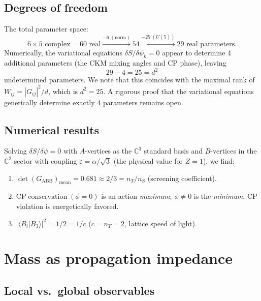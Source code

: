 \documentclass[12pt,a4paper]{article}
\newcommand{\CC}{\mathbb{C}}
\newcommand{\nS}{n_S}
\newcommand{\nT}{n_T}
\begin{document}
\subsection{Degrees of freedom}

The total parameter space:
\begin{equation}
6 \times 5 \text{ complex} = 60 \text{ real}
\xrightarrow{-6\;(\text{norm})} 54
\xrightarrow{-25\;(U(5))} 29 \text{ real parameters.}
\end{equation}
Numerically, the variational equations $\delta S/\delta\psi_k = 0$
appear to determine 4 additional parameters (the CKM mixing
angles and CP phase), leaving
\begin{equation}
29 - 4 = 25 = d^2
\end{equation}
undetermined parameters.  We note that this coincides with the
maximal rank of $W_{ij} = |G_{ij}|^2/d$, which is $d^2 = 25$.
A rigorous proof that the variational equations generically
determine exactly 4 parameters remains open.

\subsection{Numerical results}

Solving $\delta S/\delta\psi = 0$ with $A$-vertices as the
$\CC^3$ standard basis and $B$-vertices in the $\CC^2$ sector
with coupling $\varepsilon = \alpha/\sqrt{3}$ (the physical
value for $Z = 1$), we find:
\begin{enumerate}
\item $\det(G_{\mathrm{ABB}})_{\mathrm{mean}} = 0.681
\approx 2/3 = \nT/\nS$
\quad (screening coefficient).
\item $\mathrm{CP\;conservation}\;(\phi = 0)$ is an action
\emph{maximum};
$\phi \neq 0$ is the \emph{minimum}.  CP violation is
energetically favored.
\item $|\langle B_i|B_3\rangle|^2 = 1/2 = 1/c$
\quad ($c = \nT = 2$, lattice speed of light).
\end{enumerate}

\section{Mass as propagation impedance}
\label{sec:mass}

\subsection{Local vs.\ global observables}
\end{document}
